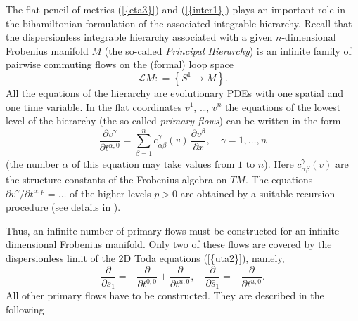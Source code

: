 \documentclass[numbook, envcountsame, envcountreset]{svjour3}
\begin{document}
The flat pencil of metrics {(\ref{{eta3}})} and {(\ref{{inter1}})} plays an important role in the bihamiltonian formulation of the associated integrable hierarchy. Recall that the dispersionless integrable hierarchy  associated with a given $n$-dimensional Frobenius manifold $M$ (the so-called {\it Principal Hierarchy}) is an infinite family of pairwise commuting flows on the (formal) loop space
$$
{{\mathcal L}} M: =\left\{ S^1 \to M\right\}.
$$
All the equations of the hierarchy are evolutionary PDEs with one spatial and one time variable. In the flat coordinates $v^1$, \dots, $v^n$ the equations of the lowest level of the hierarchy (the so-called {\it primary flows}) can be written in the form
\begin{equation}\label{inter2}
\frac{{\partial} v^\gamma}{{\partial} t^{\alpha,0}} =\sum_{\beta=1}^n c_{\alpha\beta}^\gamma(v)\, \frac{{\partial} v^\beta}{{\partial} x}, \quad \gamma=1, \dots, n
\end{equation}
(the number $\alpha$ of this equation may take values from $1$ to $n$). Here $c_{\alpha\beta}^\gamma(v)$ are the structure constants of the Frobenius algebra on $TM$. The equations ${\partial} v^\gamma/ {\partial} t^{\alpha, p} =\dots$ of the higher levels $p>0$ are obtained by a suitable recursion procedure (see details in \cite{normal,icm}).

Thus, an infinite number of primary flows must be constructed for an infinite-dimensional Frobenius manifold. Only two of these flows are covered by the dispersionless limit of the 2D Toda equations {(\ref{{uta2}})}, namely,
$$
\frac{\partial}{{\partial} s_1} =-\frac{\partial}{{\partial} t^{0,0}}+\frac{\partial}{{\partial} t^{u,0}}, \quad \frac{\partial}{{\partial} \bar s_1} =-\frac{\partial}{{\partial} t^{u,0}}.
$$
All other primary flows have to be constructed. They are described in the following
\end{document}
